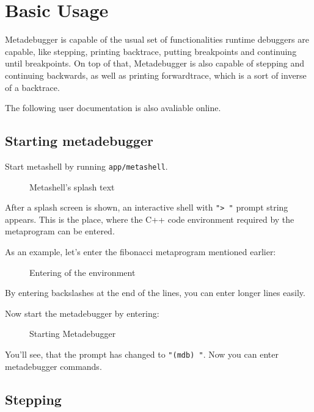 \section{Basic Usage}

Metadebugger is capable of the usual set of functionalities runtime debuggers
are capable, like stepping, printing backtrace, putting breakpoints and
continuing until breakpoints. On top of that, Metadebugger is also capable of
stepping and continuing backwards, as well as printing forwardtrace, which is
a sort of inverse of a backtrace.

The following user documentation is also avaliable online\cite{github}.

\subsection{Starting metadebugger}

Start metashell by running \texttt{app/metashell}.

\begin{figure}[H]
    
    \caption{Metashell's splash text}
\end{figure}

\noindent
After a splash screen is shown, an interactive shell with \texttt{"> "}
prompt string appears. This is the place, where the C++ code environment
required by the metaprogram can be entered.

As an example, let's enter the fibonacci metaprogram mentioned earlier:

\begin{figure}[H]
    
    \caption{Entering of the environment}
\end{figure}

\noindent
By entering backslashes at the end of the lines, you can enter longer lines
easily.

Now start the metadebugger by entering:

\begin{figure}[H]
    
    \caption{Starting Metadebugger}
\end{figure}

\noindent
You'll see, that the prompt has changed to \texttt{"(mdb) "}. Now you can enter
metadebugger commands.

\subsection{Stepping}

